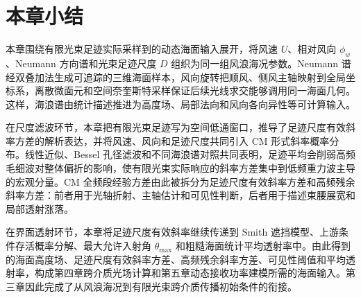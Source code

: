 \section{本章小结}

本章围绕有限光束足迹实际采样到的动态海面输入展开，将风速 $U$、相对风向 $\phi_w$、Neumann 方向谱和光束足迹尺度 $D$ 组织为同一组风浪海况参数。Neumann 谱经双叠加法生成可追踪的三维海面样本，风向旋转把顺风、侧风主轴映射到全局坐标系，离散微面元和空间奈奎斯特采样保证后续光线求交能够调用同一海面几何。这样，海浪谱由统计描述推进为高度场、局部法向和风向各向异性等可计算输入。

在尺度滤波环节，本章把有限光束足迹写为空间低通窗口，推导了足迹尺度有效斜率方差的解析表达，并将风速、风向和足迹尺度共同引入 CM 形式斜率概率分布。线性近似、Bessel 孔径滤波和不同海浪谱对照共同表明，足迹平均会削弱高频毛细波对整体偏折的影响，使有限光束实际响应的斜率方差集中到低频重力波主导的宏观分量。CM 全频段经验方差由此被拆分为足迹尺度有效斜率方差和高频残余斜率方差：前者用于光轴折射、主轴估计和可见性判断，后者用于描述束腰展宽和局部透射涨落。

在界面透射环节，本章将足迹尺度有效斜率继续传递到 Smith 遮挡模型、上游条件存活概率分解、最大允许入射角 $\theta_{\max}$ 和粗糙海面统计平均透射率中。由此得到的海面高度场、足迹尺度有效斜率方差、高频残余斜率方差、可见性阈值和平均透射率，构成第四章跨介质光场计算和第五章动态接收功率建模所需的海面输入。第三章因此完成了从风浪海况到有限光束跨介质传播初始条件的衔接。
